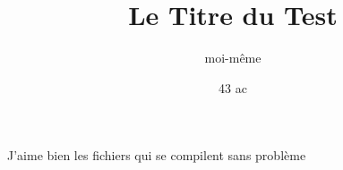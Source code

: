 \documentclass[12pt]{article} %
\author{moi-même} %
\date{43 ac} %
\title{Le Titre du Test}
\begin{document}
\onehalfspacing
\maketitle

J'aime bien les fichiers qui se compilent sans problème
\newpage
\lipsum[1-4]
\end{document}
